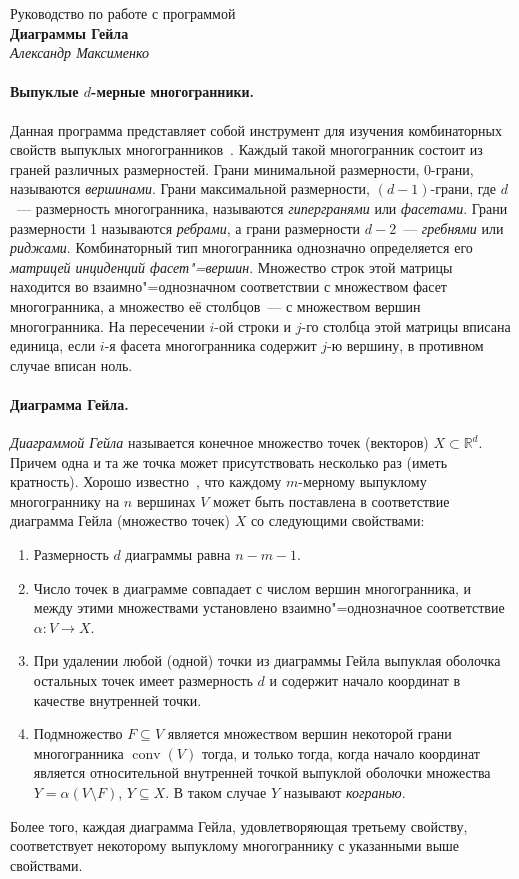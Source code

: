 \documentclass[12pt]{article}
\newcommand{\R}{\mathbb{R}}
\newcommand{\from}{\colon}
\DeclareMathOperator{\conv}{conv}
\begin{document}
\begin{center}
\large 
Руководство по работе с программой\\[0.5\baselineskip]
\textbf{Диаграммы Гейла}\\[0.5\baselineskip]
\emph{Александр Максименко}\\
\end{center}


\paragraph{Выпуклые $d$-мерные многогранники.}
Данная программа представляет собой инструмент для изучения комбинаторных свойств выпуклых многогранников~\cite{Grunbaum:2003, Ziegler:2014}.
Каждый такой многогранник состоит из граней различных размерностей.
Грани минимальной размерности, 0-грани, называются \emph{вершинами}.
Грани максимальной размерности, $(d-1)$-грани, где $d$~--- размерность многогранника,
называются \emph{гипергранями} или \emph{фасетами}.
Грани размерности 1 называются \emph{ребрами}, 
а грани размерности $d-2$~--- \emph{гребнями} или \emph{риджами}.
Комбинаторный тип многогранника однозначно определяется его \emph{матрицей инциденций фасет"=вершин}. 
Множество строк этой матрицы находится во взаимно"=однозначном соответствии с множеством фасет многогранника, а множество её столбцов~--- с множеством вершин многогранника.
На пересечении $i$-ой строки и $j$-го столбца этой матрицы вписана единица, 
если $i$-я фасета многогранника содержит $j$-ю вершину,
в противном случае вписан ноль.

\paragraph{Диаграмма Гейла.}
\emph{Диаграммой Гейла} называется конечное множество точек (векторов) $X \subset \R^d$.
Причем одна и та же точка может присутствовать несколько раз (иметь кратность).
Хорошо известно~\cite{Grunbaum:2003, Ziegler:2014}, что каждому $m$-мерному выпуклому многограннику на $n$ вершинах $V$ может быть поставлена в соответствие диаграмма Гейла (множество точек) $X$ со следующими свойствами:
\begin{enumerate}
	\item Размерность $d$ диаграммы равна $n - m - 1$.
	\item Число точек в диаграмме совпадает с числом вершин многогранника, и между этими множествами установлено взаимно"=однозначное соответствие $\alpha\from V \to X$.
	\item При удалении любой (одной) точки из диаграммы Гейла выпуклая оболочка остальных точек имеет размерность $d$ и содержит начало координат в качестве внутренней точки. 
	\item Подмножество $F \subseteq V$ является множеством вершин некоторой грани многогранника $\conv(V)$ тогда, и только тогда, когда начало координат является относительной внутренней точкой выпуклой оболочки множества $Y = \alpha(V \setminus F)$, $Y \subseteq X$.
	В таком случае $Y$ называют \emph{когранью}.
\end{enumerate}
Более того, каждая диаграмма Гейла, удовлетворяющая третьему свойству, соответствует некоторому выпуклому многограннику с указанными выше свойствами.
\end{document}
